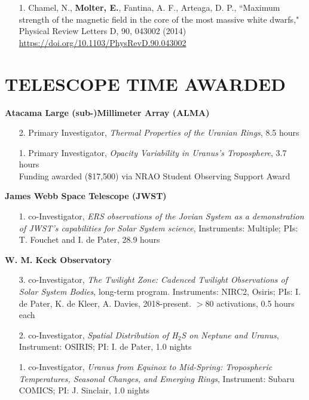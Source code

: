 \documentclass[margin, 10pt]{res} %
\begin{document}
\begin{resume}
{\begin{enumerate}
\item[1.] Chamel, N., {\bf Molter, E.}, Fantina, A. F., Arteaga, D. P., ``Maximum strength of the magnetic field in the core of the most massive white dwarfs," Physical Review Letters D, 90, 043002 (2014) \url{https://doi.org/10.1103/PhysRevD.90.043002}
\end{enumerate}

}{}

\section{TELESCOPE TIME AWARDED}


\textbf{Atacama Large (sub-)Millimeter Array (ALMA)} 
\begin{enumerate}
	\item[2.] Primary Investigator, {\it Thermal Properties of the Uranian Rings}, 8.5 hours %
	\item[1.] Primary Investigator, {\it Opacity Variability in Uranus's Troposphere}, 3.7 hours \\ Funding awarded (\$17,500) via NRAO Student Observing Support Award %
\end{enumerate}
\vspace{-0.3cm}
\textbf{James Webb Space Telescope (JWST)} 
\begin{enumerate}
	\item[1.] co-Investigator, {\it ERS observations of the Jovian System as a demonstration of JWST's capabilities for Solar System science}, Instruments: Multiple; PIs: T. Fouchet and I. de Pater, 28.9 hours %
\end{enumerate}
\vspace{-0.3cm}
\textbf{W. M. Keck Observatory} 
\begin{enumerate}
	\item[3.] co-Investigator, {\it The Twilight Zone: Cadenced Twilight Observations of Solar System Bodies}, long-term program. Instruments: NIRC2, Osiris; PIs: I. de Pater, K. de Kleer, A. Davies, 2018-present. $>$80 activations, 0.5 hours each %
	\item[2.] co-Investigator, {\it Spatial Distribution of H$_2$S on Neptune and Uranus}, Instrument: OSIRIS; PI: I. de Pater, 1.0 nights %
	\item[1.] co-Investigator, {\it Uranus from Equinox to Mid-Spring: Tropospheric Temperatures, Seasonal Changes, and Emerging Rings}, Instrument: Subaru COMICS; PI: J. Sinclair, 1.0 nights %

\end{enumerate}
\end{resume}
\end{document}
